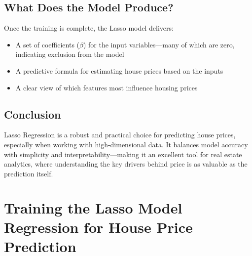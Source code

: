 \documentclass[12pt, a4paper]{report}
\begin{document}
\section{What Does the Model Produce?}

Once the training is complete, the Lasso model delivers:
\begin{itemize}
    \item A set of coefficients ($\beta$) for the input variables—many of which are zero, indicating exclusion from the model
    \item A predictive formula for estimating house prices based on the inputs
    \item A clear view of which features most influence housing prices
\end{itemize}

\section{Conclusion}

Lasso Regression is a robust and practical choice for predicting house prices, especially when working with high-dimensional data. It balances model accuracy with simplicity and interpretability—making it an excellent tool for real estate analytics, where understanding the key drivers behind price is as valuable as the prediction itself.

\chapter{Training the Lasso Model Regression for House
Price Prediction}\
\end{document}
